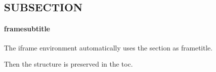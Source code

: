 \subsection{SUBSECTION}
\begin{iframe}
	\framesubtitle{framesubtitle}
	The iframe environment automatically uses the section as frametitle.

	Then the structure is preserved in the toc.
\end{iframe}